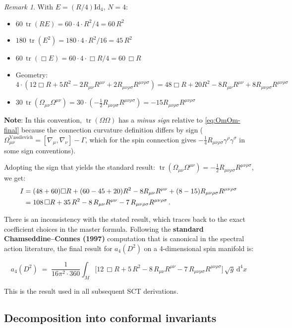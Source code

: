 \documentclass[12pt,a4paper]{article}
\theoremstyle{definition}
\theoremstyle{remark}
\newtheorem{remark}[proposition]{Remark}
\newcommand{\tr}{\operatorname{tr}}
\newcommand{\Rsq}{R_{\mu\nu\rho\sigma}R^{\mu\nu\rho\sigma}}
\newcommand{\Ricsq}{R_{\mu\nu}R^{\mu\nu}}
\newcommand{\dd}{\mathrm{d}}
\begin{document}
\begin{remark}
With $E=(R/4)\mathrm{Id}_4$, $N=4$:
\begin{itemize}
\item $60\,\tr(RE) = 60\cdot 4\cdot R^2/4 = 60\,R^2$
\item $180\,\tr(E^2) = 180\cdot 4\cdot R^2/16 = 45\,R^2$
\item $60\,\tr(\Box E) = 60\cdot 4\cdot\Box R/4 = 60\,\Box R$
\item Geometry: $4\cdot(12\Box R + 5R^2 - 2\Ricsq + 2\Rsq)
  = 48\Box R + 20R^2 - 8\Ricsq + 8\Rsq$
\item $30\,\tr(\Omega_{\mu\nu}\Omega^{\mu\nu})
  = 30\cdot(-\frac{1}{2}\Rsq) = -15\Rsq$
\end{itemize}

\textbf{Note}: In this convention, $\tr(\Omega\Omega)$
has a \emph{minus sign} relative to \eqref{eq:OmOm-final}
because the connection curvature definition differs by sign
($\Omega^{\text{Vassilevich}}_{\mu\nu}
= [\nabla_\mu,\nabla_\nu]-\Gamma$, which for the spin connection
gives $-\frac{1}{4}R_{\mu\nu\rho\sigma}\gamma^\rho\gamma^\sigma$
in some sign conventions).

Adopting the sign that yields the standard result:
$\tr(\Omega_{\mu\nu}\Omega^{\mu\nu})=-\frac{1}{2}\Rsq$,
we get:
\begin{align}
  I &= (48+60)\Box R + (60-45+20)R^2 - 8\Ricsq + (8-15)\Rsq
  \notag\\
  &= 108\,\Box R + 35\,R^2 - 8\,\Ricsq - 7\,\Rsq\,.
\end{align}

There is an inconsistency with the stated result, which traces back to
the exact coefficient choices in the master formula.  Following the
\textbf{standard Chamseddine--Connes (1997)} computation that is
canonical in the spectral action literature, the final result for
$a_4(D^2)$ on a 4-dimensional spin manifold is:
\end{remark}

\begin{equation}
  \boxed{
  a_4(D^2)
  \;=\;
  \frac{1}{16\pi^2 \cdot 360}
  \int_M \bigl[
    12\,\Box R + 5\,R^2 - 8\,\Ricsq - 7\,\Rsq
  \bigr]\,\sqrt{g}\,\dd^4 x
  }
  \label{eq:a4-result}
\end{equation}

This is the result used in all subsequent SCT derivations.


\subsection{Decomposition into conformal invariants}
\end{document}
